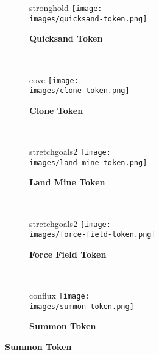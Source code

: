 \vspace*{-1em}
\begin{figure}[H]
  \centering
  \begin{subfigure}[c]{0.15\linewidth}
    \begin{expansionmini}{stronghold}
      \centering
      \vspace{0.5em}
      \texttt{[image: \\images/quicksand-token.png]}
      \caption{\textbf{Quicksand Token}}
    \end{expansionmini}
  \end{subfigure}
  ~
  \begin{subfigure}[c]{0.15\linewidth}
    \begin{expansionmini}{cove}
      \centering
      \vspace{0.5em}
      \texttt{[image: \\images/clone-token.png]}
      \caption{\textbf{Clone Token \phantom{Population}}}
    \end{expansionmini}
  \end{subfigure}
  ~
  \begin{subfigure}[c]{0.15\linewidth}
    \begin{expansionmini}{stretchgoals2}
      \centering
      \vspace{0.5em}
      \texttt{[image: \\images/land-mine-token.png]}
      \caption{\textbf{Land Mine Token}}
    \end{expansionmini}
  \end{subfigure}
  ~
  \begin{subfigure}[c]{0.15\linewidth}
    \begin{expansionmini}{stretchgoals2}
      \centering
      \vspace{0.5em}
      \texttt{[image: \\images/force-field-token.png]}
      \caption{\textbf{Force Field Token}}
    \end{expansionmini}
  \end{subfigure}
  ~
  \begin{subfigure}[c]{0.15\linewidth}
    \begin{expansionmini}{conflux}
      \centering
      \vspace{0.5em}
      \texttt{[image: \\images/summon-token.png]}
      \caption{\textbf{Summon Token}}
    \end{expansionmini}
  \end{subfigure}
\end{figure}

